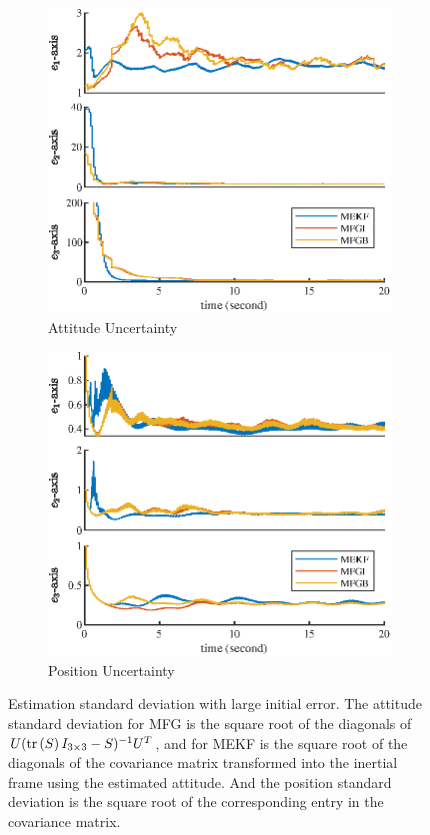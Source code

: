 \begin{figure}
	\centering
	\begin{subfigure}{\textwidth}
		\centering
		\includegraphics[scale=1.15]{figures/posEst-std-att}
		\caption{Attitude Uncertainty}
		\label{fig:posEst-std-att}
	\end{subfigure}
	\begin{subfigure}{\textwidth}
		\centering
		\includegraphics[scale=1.15]{figures/posEst-std-pos}
		\caption{Position Uncertainty}
		\label{fig:posEst-std-pos}
	\end{subfigure}
	\caption{Estimation standard deviation with large initial error.
		The attitude standard deviation for MFG is the square root of the diagonals of $U(\mathrm{tr}\left( S \right)I_{3\times 3}-S)^{-1}U^T$, and for MEKF is the square root of the diagonals of the covariance matrix transformed into the inertial frame using the estimated attitude.
		And the position standard deviation is the square root of the corresponding entry in the covariance matrix.}
	\label{fig:posEst-std}
\end{figure}

